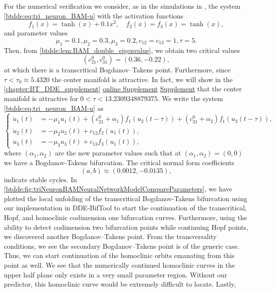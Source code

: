 For the numerical verification we consider, as in the simulations in
\cite[Example 1]{dong2013bogdanov}, the system \cref{btdde:eq:tri_neuron_BAM-u} with
the activation functions
\[
f_{1}(x)=\tanh(x)+0.1x^{2},\quad f_{2}(x)=f_{3}(x)=\tanh(x),
\]
and parameter values
\[
\mu_{1}=0.1,\mu_{2}=0.3,\mu_{3}=0.2,c_{12}=c_{13}=1,\tau=5.
\]
Then, from \cref{btdde:lem:BAM_double_eigenvalue}, we obtain two critical
values 
\[
(c_{21}^{0},c_{31}^{0})=(0.36,-0.22),
\]
at which there is a transcritical Bogdanov--Takens point. Furthermore, since
$\tau < \tau_0 \approx 5.4320$ the center manifold is attractive. In fact, we
will show in the
\ifthesis%
    \cref{chapter:BT_DDE_supplement} %
\fi%
\ifsiam%
    \hyperref[mysupplement]{online Supplement} %
\fi%
\ifarxiv%
    \hyperlink{mysupplement}{Supplement} %
\fi
that the center manifold is attractive for
$0<\tau<13.2309348879375$. We write the system \cref{btdde:eq:tri_neuron_BAM-u}
as
\begin{equation}
\label{btdde:eq:tri_neuron_BAM-u-1}
\begin{cases}
\dot{u}_{1}(t) & =-\mu_{1}u_{1}(t)+\left(c_{21}^{0}+\alpha_{1}\right)f_{1}(u_{2}(t-\tau))+\left(c_{31}^{0}+\alpha_{2}\right)f_{1}(u_{3}(t-\tau)),\\
\dot{u}_{2}(t) & =-\mu_{2}u_{2}(t)+c_{12}f_{2}(u_{1}(t)),\\
\dot{u}_{3}(t) & =-\mu_{3}u_{3}(t)+c_{13}f_{3}(u_{1}(t)),
\end{cases}
\end{equation}
where $(\alpha_{1},\alpha_{2})$ are the new parameter values such
that at $(\alpha_{1},\alpha_{2})=(0,0)$ we have a Bogdanov-Takens
bifurcation. The critical normal form coefficients 
\[
(a,b)\approx(0.0012,-0.0135),
\]
indicate stable cycles. In
\cref{btdde:fig:triNeuronBAMNeuralNetworkModelCompareParameters}, we have plotted the
local unfolding of the transcritical Bogdanov-Takens bifurcation using our
implementation in DDE-BifTool to start the continuation of the transcritical,
Hopf, and homoclinic codimension one bifurcation curves. Furthermore, using the
ability to detect codimension two bifurcation points while continuing Hopf
points, we discovered another Bogdanov--Takens point. From the transversality
conditions, we see the secondary Bogdanov--Takens point is of the generic case.
Thus, we can start continuation of the homoclinic orbits emanating from this
point as well. We see that the numerically continued homoclinic curves in the
upper half plane only exists in a very small parameter region. Without our
predictor, this homoclinic curve would be extremely difficult to locate. Lastly,
